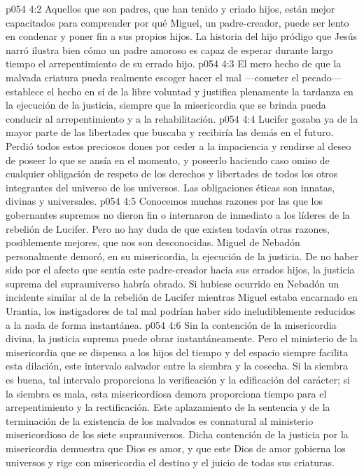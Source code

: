 \vs p054 4:2 Aquellos que son padres, que han tenido y criado hijos, están mejor capacitados para comprender por qué Miguel, un padre\hyp{}creador, puede ser lento en condenar y poner fin a sus propios hijos. La historia del hijo pródigo que Jesús narró ilustra bien cómo un padre amoroso es capaz de esperar durante largo tiempo el arrepentimiento de su errado hijo.
\vs p054 4:3 El mero hecho de que la malvada criatura pueda realmente escoger hacer el mal ---cometer el pecado--- establece el hecho en sí de la libre voluntad y justifica plenamente la tardanza en la ejecución de la justicia, siempre que la misericordia que se brinda pueda conducir al arrepentimiento y a la rehabilitación.
\vs p054 4:4 \pc Lucifer gozaba ya de la mayor parte de las libertades que buscaba y recibiría las demás en el futuro. Perdió todos estos preciosos dones por ceder a la impaciencia y rendirse al deseo de poseer lo que se ansía en el momento, y poseerlo haciendo caso omiso de cualquier obligación de respeto de los derechos y libertades de todos los otros integrantes del universo de los universos. Las obligaciones éticas son innatas, divinas y universales.
\vs p054 4:5 \pc Conocemos muchas razones por las que los gobernantes supremos no dieron fin o internaron de inmediato a los líderes de la rebelión de Lucifer. Pero no hay duda de que existen todavía otras razones, posiblemente mejores, que nos son desconocidas. Miguel de Nebadón personalmente demoró, en su misericordia, la ejecución de la justicia. De no haber sido por el afecto que sentía este padre\hyp{}creador hacia sus errados hijos, la justicia suprema del suprauniverso habría obrado. Si hubiese ocurrido en Nebadón un incidente similar al de la rebelión de Lucifer mientras Miguel estaba encarnado en Urantia, los instigadores de tal mal podrían haber sido ineludiblemente reducidos a la nada de forma instantánea.
\vs p054 4:6 Sin la contención de la misericordia divina, la justicia suprema puede obrar instantáneamente. Pero el ministerio de la misericordia que se dispensa a los hijos del tiempo y del espacio siempre facilita esta dilación, este intervalo salvador entre la siembra y la cosecha. Si la siembra es buena, tal intervalo proporciona la verificación y la edificación del carácter; si la siembra es mala, esta misericordiosa demora proporciona tiempo para el arrepentimiento y la rectificación. Este aplazamiento de la sentencia y de la terminación de la existencia de los malvados es connatural al ministerio misericordioso de los siete suprauniversos. Dicha contención de la justicia por la misericordia demuestra que Dios es amor, y que este Dios de amor gobierna los universos y rige con misericordia el destino y el juicio de todas sus criaturas.

